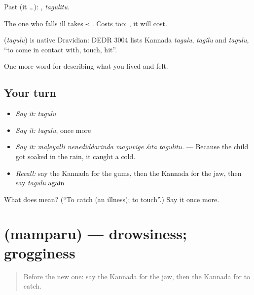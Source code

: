 Past (it …): , \emph{tagulitu}.

The one who falls ill takes -:   . Costs too:  , it will cost.

\begin{cousinweb}
\textbf{} (\emph{tagulu}) is native Dravidian: DEDR 3004 lists Kannada \emph{tagalu}, \emph{tagilu} and \emph{tagulu}, \textquotedblleft{}to come in contact with, touch, hit\textquotedblright{}.
\end{cousinweb}

\begin{grammarlens}[title={What you've built}]
One more word for describing what you lived and felt.
\end{grammarlens}

\subsection*{Your turn}
\begin{itemize}
\raggedright
  \item \emph{Say it:} \emph{tagulu}
  \item \emph{Say it:} \emph{tagulu}, once more
  \item \emph{Say it:} \emph{maḷeyalli nenediddarinda maguvige śīta tagulitu.} — Because the child got soaked in the rain, it caught a cold.
  \item \emph{Recall:} say the Kannada for the gums, then the Kannada for the jaw, then say \emph{tagulu} again
\end{itemize}

\begin{tcolorbox}[breakable,colback=teal!4,colframe=teal!35!black,title={Before you move on}]
What does  mean? (\textquotedblleft{}To catch (an illness); to touch\textquotedblright{}.) Say it once more.
\end{tcolorbox}
\section[\texorpdfstring{\kn{ಮಂಪರು} (mamparu)}{ಮಂಪರು (mamparu)}]{ (mamparu) — drowsiness; grogginess}

\label{lesson:KA-C511-mamparu}



\begin{quote}
Before the new one: say the Kannada for the jaw, then the Kannada for to catch.
\end{quote}

